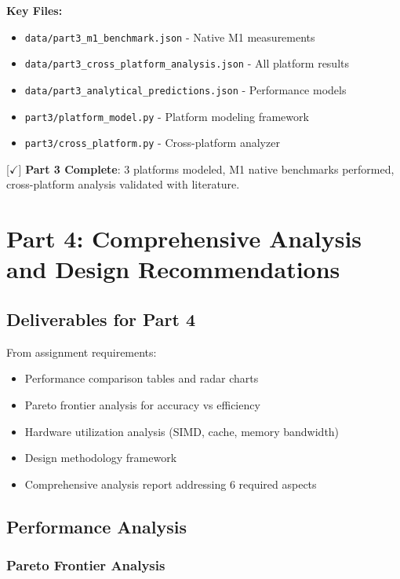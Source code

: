 \documentclass[10pt, a4paper]{article}
\begin{document}
\textbf{Key Files:}
\begin{itemize}
    \item \texttt{data/part3\_m1\_benchmark.json} - Native M1 measurements
    \item \texttt{data/part3\_cross\_platform\_analysis.json} - All platform results
    \item \texttt{data/part3\_analytical\_predictions.json} - Performance models
    \item \texttt{part3/platform\_model.py} - Platform modeling framework
    \item \texttt{part3/cross\_platform.py} - Cross-platform analyzer
\end{itemize}

[$\checkmark$] \textbf{Part 3 Complete}: 3 platforms modeled, M1 native benchmarks performed, cross-platform analysis validated with literature.

\section*{Part 4: Comprehensive Analysis and Design Recommendations}

\subsection{Deliverables for Part 4}

From assignment requirements:
\begin{itemize}
    \item Performance comparison tables and radar charts
    \item Pareto frontier analysis for accuracy vs efficiency
    \item Hardware utilization analysis (SIMD, cache, memory bandwidth)
    \item Design methodology framework
    \item Comprehensive analysis report addressing 6 required aspects
\end{itemize}

\subsection{Performance Analysis}

\subsubsection{Pareto Frontier Analysis}
\end{document}
